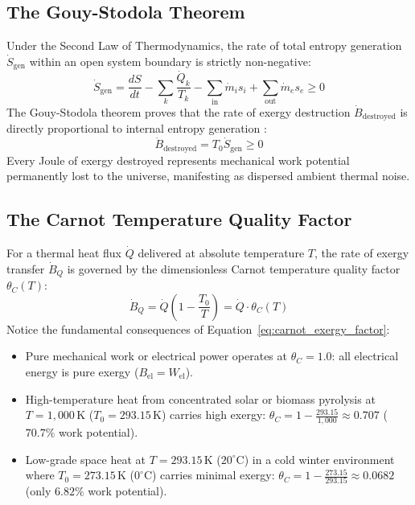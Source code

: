 \subsection{The Gouy-Stodola Theorem}
Under the Second Law of Thermodynamics, the rate of total entropy generation $\dot{S}_{\mathrm{gen}}$ within an open system boundary is strictly non-negative:
\begin{equation}
\dot{S}_{\mathrm{gen}} = \frac{dS}{dt} - \sum_k \frac{\dot{Q}_k}{T_k} - \sum_{\mathrm{in}} \dot{m}_i s_i + \sum_{\mathrm{out}} \dot{m}_e s_e \ge 0
\label{eq:entropy_generation_rate}
\end{equation}
The Gouy-Stodola theorem proves that the rate of exergy destruction $\dot{B}_{\mathrm{destroyed}}$ is directly proportional to internal entropy generation \cite{szargut1988exergy}:
\begin{equation}
\dot{B}_{\mathrm{destroyed}} = T_0 \dot{S}_{\mathrm{gen}} \ge 0
\label{eq:gouy_stodola_theorem}
\end{equation}
Every Joule of exergy destroyed represents mechanical work potential permanently lost to the universe, manifesting as dispersed ambient thermal noise.

\subsection{The Carnot Temperature Quality Factor}
For a thermal heat flux $\dot{Q}$ delivered at absolute temperature $T$, the rate of exergy transfer $\dot{B}_Q$ is governed by the dimensionless Carnot temperature quality factor $\theta_C(T)$:
\begin{equation}
\dot{B}_Q = \dot{Q} \left( 1 - \frac{T_0}{T} \right) = \dot{Q} \cdot \theta_C(T)
\label{eq:carnot_exergy_factor}
\end{equation}
Notice the fundamental consequences of Equation~\eqref{eq:carnot_exergy_factor}:
\begin{itemize}
    \item Pure mechanical work or electrical power operates at $\theta_C = 1.0$: all electrical energy is pure exergy ($B_{\mathrm{el}} = W_{\mathrm{el}}$).
    \item High-temperature heat from concentrated solar or biomass pyrolysis at $T = 1,000\,\mathrm{K}$ ($T_0 = 293.15\,\mathrm{K}$) carries high exergy: $\theta_C = 1 - \frac{293.15}{1,000} \approx 0.707$ ($70.7\%$ work potential).
    \item Low-grade space heat at $T = 293.15\,\mathrm{K}$ ($20^\circ\mathrm{C}$) in a cold winter environment where $T_0 = 273.15\,\mathrm{K}$ ($0^\circ\mathrm{C}$) carries minimal exergy: $\theta_C = 1 - \frac{273.15}{293.15} \approx 0.0682$ (only $6.82\%$ work potential).
\end{itemize}

